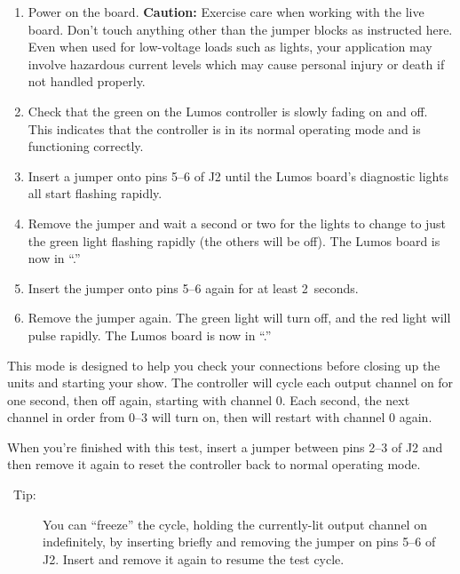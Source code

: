 \documentclass[letterpaper,twoside,onecolumn,openright,final]{memoir}
\begin{document}
\begin{enumerate}
	\item	Power on the board.
		{\bfseries Caution:} Exercise care when working with the live board.  Don't touch anything
		other than the jumper blocks as instructed here.  %
		Even when used for low-voltage loads such as  lights, your application may involve
		hazardous current levels which may cause personal injury or death if not handled properly.

	\item	Check that the green  on the Lumos controller is slowly fading on and off.  This indicates
		that the controller is in its normal operating mode and is functioning correctly.

	\item	Insert a jumper onto pins 5--6 of J2 until the Lumos board's diagnostic lights all start
		flashing rapidly.

	\item	Remove the jumper and wait a second or two for the lights to change to just the green light
		flashing rapidly (the others will be off).  
		The Lumos board is now in ``.''

	\item	Insert the jumper onto pins 5--6 again for at least 2~seconds.

	\item	Remove the jumper again.  The green light will turn off, and the red light will pulse rapidly.
		The Lumos board is now in ``.''
\end{enumerate}

This mode is designed to help you check your connections before closing up the units and starting your
show.  The controller will cycle each output channel on for one second, then off again, starting with channel 0.  
Each second, the next channel in order from 0--3 will turn on, then will restart with channel 0 again.

When you're finished with this test, insert a jumper between pins 2--3 of J2 and then remove it again
to reset the controller back to normal operating mode.

\begin{description}
	\item[\HandRight\ Tip:]  You can ``freeze'' the cycle, holding the currently-lit
		output channel on indefinitely, by inserting briefly and removing the jumper
		on pins 5--6 of J2.
		Insert and remove it again to resume the test cycle.
\end{description}
\end{document}
